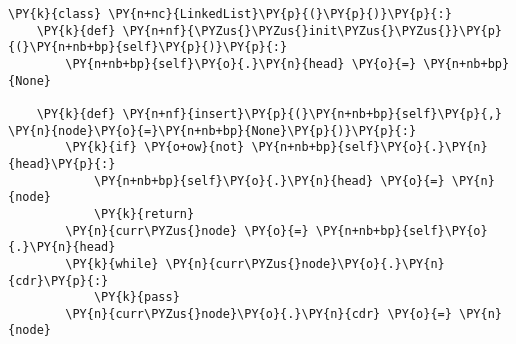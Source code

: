 \begin{Verbatim}[commandchars=\\\{\}]
\PY{k}{class} \PY{n+nc}{LinkedList}\PY{p}{(}\PY{p}{)}\PY{p}{:}
    \PY{k}{def} \PY{n+nf}{\PYZus{}\PYZus{}init\PYZus{}\PYZus{}}\PY{p}{(}\PY{n+nb+bp}{self}\PY{p}{)}\PY{p}{:}
        \PY{n+nb+bp}{self}\PY{o}{.}\PY{n}{head} \PY{o}{=} \PY{n+nb+bp}{None}

    \PY{k}{def} \PY{n+nf}{insert}\PY{p}{(}\PY{n+nb+bp}{self}\PY{p}{,} \PY{n}{node}\PY{o}{=}\PY{n+nb+bp}{None}\PY{p}{)}\PY{p}{:}
        \PY{k}{if} \PY{o+ow}{not} \PY{n+nb+bp}{self}\PY{o}{.}\PY{n}{head}\PY{p}{:}
            \PY{n+nb+bp}{self}\PY{o}{.}\PY{n}{head} \PY{o}{=} \PY{n}{node}
            \PY{k}{return}
        \PY{n}{curr\PYZus{}node} \PY{o}{=} \PY{n+nb+bp}{self}\PY{o}{.}\PY{n}{head}
        \PY{k}{while} \PY{n}{curr\PYZus{}node}\PY{o}{.}\PY{n}{cdr}\PY{p}{:}
            \PY{k}{pass}
        \PY{n}{curr\PYZus{}node}\PY{o}{.}\PY{n}{cdr} \PY{o}{=} \PY{n}{node}
\end{Verbatim}
